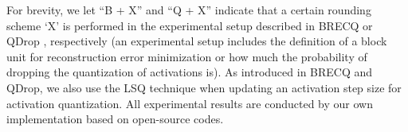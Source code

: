 \documentclass{article}
\theoremstyle{plain}
\theoremstyle{definition}
\theoremstyle{remark}
\begin{document}
For brevity, we let ``B + X'' and ``Q + X'' indicate that a certain rounding scheme `X' is performed in the experimental setup described in BRECQ \citep{li2021brecq} or QDrop \citep{wei2022qdrop}, respectively (an experimental setup includes the definition of a block unit for reconstruction error minimization or how much the probability of dropping the quantization of activations is). As introduced in BRECQ and QDrop, we also use the LSQ technique \citep{esser2020learned} when updating an activation step size for activation quantization. 
All experimental results are conducted by our own implementation based on open-source codes.
\end{document}
